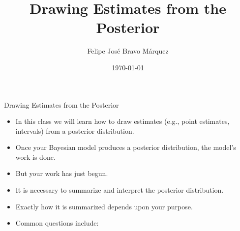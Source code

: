 \documentclass[handout]{beamer}
\title{Drawing Estimates from the Posterior}
\author[Felipe Bravo Márquez]{\footnotesize
 \textcolor[rgb]{0.00,0.00,1.00}{Felipe José Bravo Márquez}}
\date{ \today }
\begin{document}
\begin{frame}
\titlepage


\end{frame}




\begin{frame}{Drawing Estimates from the Posterior}
\scriptsize{
\begin{itemize}

\item In this class we will learn how to draw estimates (e.g., point estimates, intervals) from a posterior distribution.

\item Once your Bayesian model produces a posterior distribution, the model's work is done.

\item But your work has just begun. 

\item It is necessary to summarize and interpret the posterior distribution.

\item Exactly how it is summarized depends upon your purpose.

\item Common questions include:
\begin{itemize}
\end{itemize}
 
\end{itemize}



} 

\end{frame}
\end{document}
